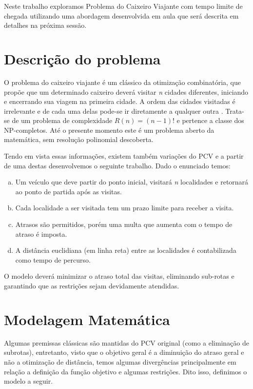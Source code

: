 \documentclass[12pt]{article}
\begin{document}
Neste trabalho exploramos Problema do Caixeiro Viajante com tempo limite de chegada utilizando uma abordagem desenvolvida em aula que será descrita em detalhes na próxima sessão.


\section{Descrição do problema}

O problema do caixeiro viajante é um clássico da otimização combinatória, que propõe que um determinado caixeiro deverá visitar {\it n} cidades diferentes, iniciando e encerrando sua viagem na primeira cidade. A ordem das cidades visitadas é irrelevante e de cada uma delas pode-se ir diretamente a qualquer outra \cite{porto-da-silveira_2000}. Trata-se de um problema de complexidade $R(n) = (n -1)!$ e pertence a classe dos NP-completos. Até o presente momento este é um problema aberto da matemática, sem resolução polinomial descoberta.

Tendo em vista essas informações, existem também variações do PCV e a partir de uma destas desenvolvemos o seguinte trabalho. Dado o enunciado temos:


\begin{enumerate}[(a)]
  \item Um veículo que deve partir do ponto inicial, visitará {\it n} localidades e retornará ao ponto de partida após as visitas.
  \item Cada localidade a ser visitada tem um prazo limite para receber a visita.
  \item Atrasos são permitidos, porém uma multa que aumenta com o tempo de atraso é imposta.
  \item A distância euclidiana (em linha reta) entre as localidades é contabilizada como tempo de percurso.
\end{enumerate}

O modelo deverá minimizar o atraso total das visitas, eliminando sub-rotas e garantindo que as restrições sejam devidamente atendidas.


\section{Modelagem Matemática}
Algumas premissas clássicas são mantidas do PCV original (como a eliminação de subrotas), entretanto, visto que o objetivo geral é a diminuição do atraso geral e não a otimização de distância, temos algumas divergências principalmente em relação a definição da função objetivo e algumas restrições. Dito isso, definimos o modelo a seguir.
\end{document}
